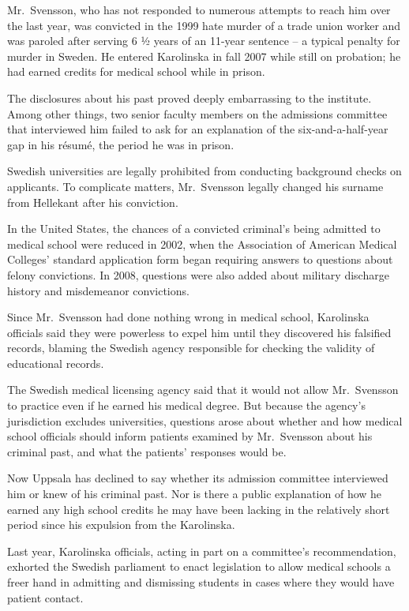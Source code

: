 \documentclass[12pt,a4paper,onecolumn]{article}
\begin{document}
\begin{CJK*}{GBK}{song}
Mr.~Svensson, who has not responded to numerous attempts to reach him over the last year, was
convicted in the 1999 hate murder of a trade union worker and was paroled after serving 6 ½ years of
an 11-year sentence -- a typical penalty for murder in Sweden. He entered Karolinska in fall 2007
while still on probation; he had earned credits for medical school while in prison.

The disclosures about his past proved deeply embarrassing to the institute. Among other things, two
senior faculty members on the admissions committee that interviewed him failed to ask for an
explanation of the six-and-a-half-year gap in his r\'esum\'e, the period he was in prison.

Swedish universities are legally prohibited from conducting background checks on applicants. To
complicate matters, Mr.~Svensson legally changed his surname from Hellekant after his conviction.

In the United States, the chances of a convicted criminal's being admitted to medical school were
reduced in 2002, when the Association of American Medical Colleges' standard application form began
requiring answers to questions about felony convictions. In 2008, questions were also added about
military discharge history and misdemeanor convictions.

Since Mr.~Svensson had done nothing wrong in medical school, Karolinska officials said they were
powerless to expel him until they discovered his falsified records, blaming the Swedish agency
responsible for checking the validity of educational records.

The Swedish medical licensing agency said that it would not allow Mr.~Svensson to practice even if
he earned his medical degree. But because the agency's jurisdiction excludes universities, questions
arose about whether and how medical school officials should inform patients examined by Mr.~Svensson
about his criminal past, and what the patients' responses would be.

Now Uppsala has declined to say whether its admission committee interviewed him or knew of his
criminal past. Nor is there a public explanation of how he earned any high school credits he may
have been lacking in the relatively short period since his expulsion from the Karolinska.

Last year, Karolinska officials, acting in part on a committee's recommendation, exhorted the
Swedish parliament to enact legislation to allow medical schools a freer hand in admitting and
dismissing students in cases where they would have patient contact.


\end{CJK*}
\end{document}
